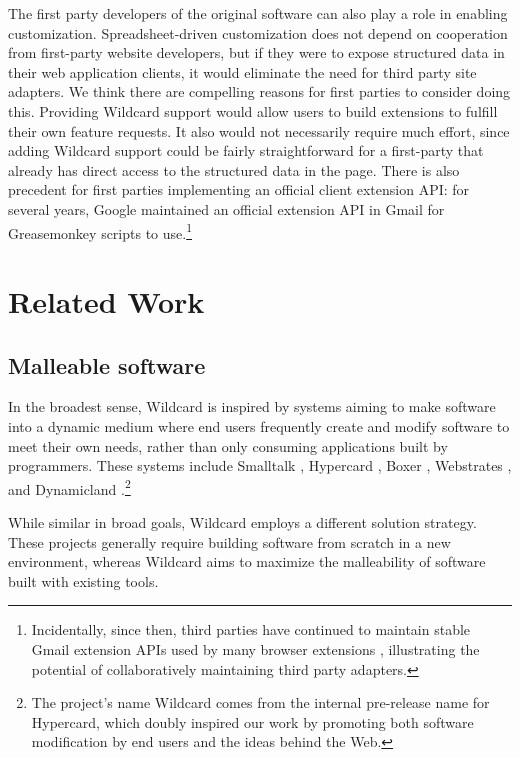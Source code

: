 \documentclass[english,submission]{programming}
\begin{document}
The first party developers of the original software can also play a role
in enabling customization. Spreadsheet-driven customization does not
depend on cooperation from first-party website developers, but if they
were to expose structured data in their web application clients, it
would eliminate the need for third party site adapters. We think there
are compelling reasons for first parties to consider doing this.
Providing Wildcard support would allow users to build extensions to
fulfill their own feature requests. It also would not necessarily
require much effort, since adding Wildcard support could be fairly
straightforward for a first-party that already has direct access to the
structured data in the page. There is also precedent for first parties
implementing an official client extension API: for several years, Google
maintained an official extension API in Gmail for Greasemonkey scripts
to use.\footnote{Incidentally, since then, third parties have continued
  to maintain stable Gmail extension APIs used by many browser
  extensions \autocite{streak,talwar2019}, illustrating the potential of
  collaboratively maintaining third party adapters.}

\hypertarget{sec:related-work}{%
\section{Related Work}\label{sec:related-work}}

\hypertarget{malleable-software}{%
\subsection{Malleable software}\label{malleable-software}}

In the broadest sense, Wildcard is inspired by systems aiming to make
software into a dynamic medium where end users frequently create and
modify software to meet their own needs, rather than only consuming
applications built by programmers. These systems include Smalltalk
\autocite{kay1977}, Hypercard \autocite{hypercard2019} , Boxer
\autocite{disessa1986}, Webstrates \autocite{klokmose2015}, and
Dynamicland \autocite{victor}.\footnote{The project's name Wildcard
  comes from the internal pre-release name for Hypercard, which doubly
  inspired our work by promoting both software modification by end users
  and the ideas behind the Web.}

While similar in broad goals, Wildcard employs a different solution
strategy. These projects generally require building software from
scratch in a new environment, whereas Wildcard aims to maximize the
malleability of software built with existing tools.
\end{document}
